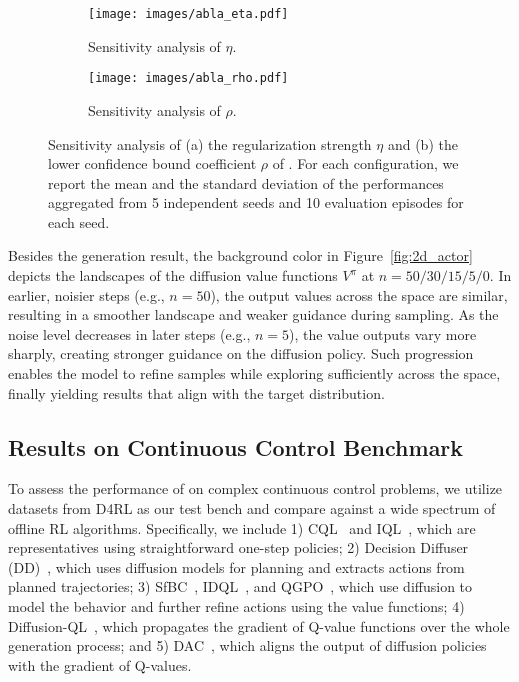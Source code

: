 \begin{figure*}[htbp]
    \centering
    \begin{subfigure}[b]{0.45\textwidth}
        \texttt{[image: images/abla\_eta.pdf]}
        \caption{Sensitivity analysis of $\eta$.}
        \label{exp:abla_eta}
    \end{subfigure}
    \begin{subfigure}[b]{0.45\textwidth}
        \texttt{[image: images/abla\_rho.pdf]}
        \caption{Sensitivity analysis of $\rho$.}
        \label{exp:abla_rho}
    \end{subfigure}
    \caption{Sensitivity analysis of (a) the regularization strength $\eta$ and (b) the lower confidence bound coefficient $\rho$ of \algbb. For each configuration, we report the mean and the standard deviation of the performances aggregated from 5 independent seeds and 10 evaluation episodes for each seed. }
\end{figure*}


Besides the generation result, the background color in Figure~\ref{fig:2d_actor} depicts the landscapes of the diffusion value functions $V^\pi$ at $n=50/30/15/5/0$. In earlier, noisier steps (e.g., $n=50$), the output values across the space are similar, resulting in a smoother landscape and weaker guidance during sampling. As the noise level decreases in later steps (e.g., $n=5$), the value outputs vary more sharply, creating stronger guidance on the diffusion policy. Such progression enables the model to refine samples while exploring sufficiently across the space, finally yielding results that align with the target distribution.

\subsection{Results on Continuous Control Benchmark}

To assess the performance of \algbb on complex continuous control problems, we utilize datasets from D4RL as our test bench and compare \algbb against a wide spectrum of offline RL algorithms. Specifically, we include 1) CQL~\citep{cql} and IQL~\citep{iql}, which are representatives using straightforward one-step policies; 2) Decision Diffuser (DD)~\citep{dd}, which uses diffusion models for planning and extracts actions from planned trajectories; 3) SfBC~\citep{sfbc}, IDQL~\citep{idql}, and QGPO~\citep{qgpo}, which use diffusion to model the behavior and further refine actions using the value functions; 4) Diffusion-QL~\citep{dql}, which propagates the gradient of Q-value functions over the whole generation process; and 5) DAC~\citep{dac}, which aligns the output of diffusion policies with the gradient of Q-values. 




